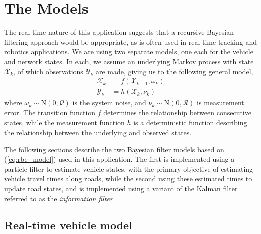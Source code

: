 \section{The Models}
\label{sec:models}

The real-time nature of this application suggests that
a recursive Bayesian filtering approach would be appropriate, as is often used in
real-time tracking and robotics applications.
We are using two separate models, one each for the vehicle and network states.
In each,
we assume an underlying Markov process with state $\mathcal{X}_k$,
of which observations $\mathcal{Y}_k$ are made,
giving us to the following general model,
\begin{equation}
\label{eq:rbe_model}
\begin{split}
\mathcal{X}_k &= f(\mathcal{X}_{k-1}, \omega_k) \\
\mathcal{Y}_k &= h(\mathcal{X}_k, \nu_k)
\end{split}
\end{equation}
where $\omega_k\sim\mathrm{N}(0,\mathcal{Q})$ is the system noise,
and $\nu_k\sim\mathrm{N}(0,\mathcal{R})$ is measurement error.
The transition function $f$ determines the relationship between consecutive states,
while the measurement function $h$ is a deterministic function describing the
relationship between the underlying and observed states.

The following sections describe the two Bayesian filter models based on (\ref{eq:rbe_model}) used in this application.
The first is implemented using a particle filter to estimate vehicle states,
with the primary objective of estimating vehicle travel times along roads,
while the second using these estimated times to update road states,
and is implemented using a variant of the Kalman filter referred to as the \emph{information filter}
\citep{}.

\subsection{Real-time vehicle model}
\label{sec:pf}

